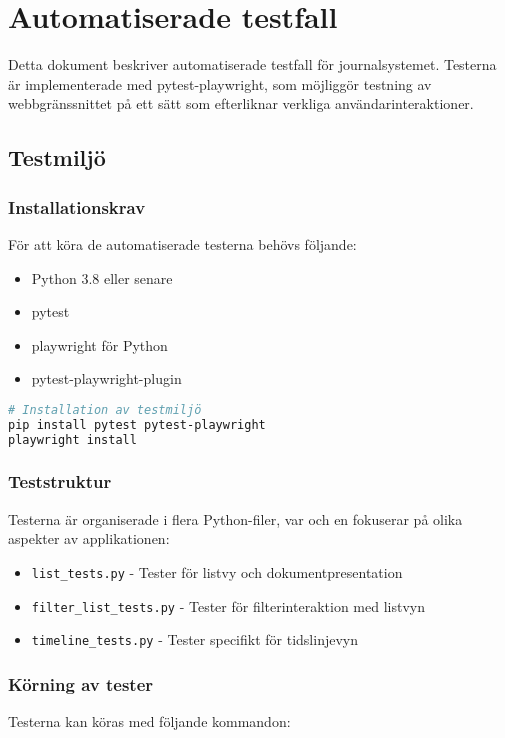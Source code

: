 \section{Automatiserade testfall}

Detta dokument beskriver automatiserade testfall för journalsystemet. Testerna är implementerade med pytest-playwright, som möjliggör testning av webbgränssnittet på ett sätt som efterliknar verkliga användarinteraktioner.

\subsection{Testmiljö}

\subsubsection{Installationskrav}
För att köra de automatiserade testerna behövs följande:

\begin{itemize}
    \item Python 3.8 eller senare
    \item pytest
    \item playwright för Python
    \item pytest-playwright-plugin
\end{itemize}

\begin{lstlisting}[language=bash]
# Installation av testmiljö
pip install pytest pytest-playwright
playwright install
\end{lstlisting}

\subsubsection{Teststruktur}
Testerna är organiserade i flera Python-filer, var och en fokuserar på olika aspekter av applikationen:

\begin{itemize}
    \item \texttt{list\_tests.py} - Tester för listvy och dokumentpresentation
    \item \texttt{filter\_list\_tests.py} - Tester för filterinteraktion med listvyn
    \item \texttt{timeline\_tests.py} - Tester specifikt för tidslinjevyn
\end{itemize}

\subsubsection{Körning av tester}
Testerna kan köras med följande kommandon:

